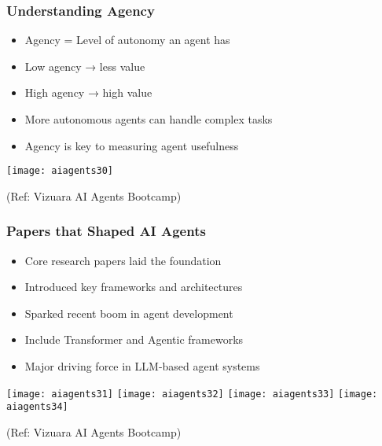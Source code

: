 \begin{frame}[fragile]\frametitle{Understanding Agency}

      \begin{itemize}
        \item Agency = Level of autonomy an agent has
        \item Low agency → less value
        \item High agency → high value
        \item More autonomous agents can handle complex tasks
        \item Agency is key to measuring agent usefulness
      \end{itemize}

		\begin{center}
		\texttt{[image: aiagents30]}
		
		{\tiny (Ref: Vizuara AI Agents Bootcamp)}
		\end{center}	

\end{frame}

\begin{frame}[fragile]\frametitle{Papers that Shaped AI Agents}

      \begin{itemize}
        \item Core research papers laid the foundation
        \item Introduced key frameworks and architectures
        \item Sparked recent boom in agent development
        \item Include Transformer and Agentic frameworks
        \item Major driving force in LLM-based agent systems
      \end{itemize}

		\begin{center}
		\texttt{[image: aiagents31]}
		\texttt{[image: aiagents32]}
		\texttt{[image: aiagents33]}
		\texttt{[image: aiagents34]}
		
		{\tiny (Ref: Vizuara AI Agents Bootcamp)}
		\end{center}	
 
\end{frame}

